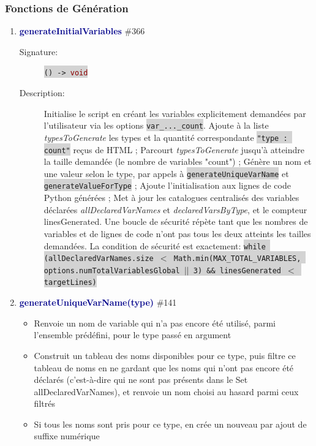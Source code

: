 \documentclass[11pt,a4paper]{article}
\newcommand{\code}[1]{\colorbox{lightgray}{\texttt{\small #1}}}
\newcommand{\var}[1]{\textit{#1}}
\newcommand{\methodname}[1]{\textbf{\textcolor{darkblue}{#1}}}
\newcommand{\param}[1]{\code{#1}}
\newcommand{\rettype}[1]{\textcolor{darkred}{#1}}
\begin{document}
\subsubsection*{Fonctions de Génération}

\begin{enumerate}
    \item \methodname{generateInitialVariables} \#366
    \begin{description}
        \item[Signature:] \code{() -> \rettype{void}}
        \item[Description:] Initialise le script en créant les variables explicitement demandées par l'utilisateur via les options \param{var\_...\_count}. Ajoute à la liste \var{typesToGenerate} les types et la quantité correspondante \code{"type : count"} reçus de HTML ; Parcourt \var{typesToGenerate} jusqu'à atteindre la taille demandée (le nombre de variables "count") ; Génère un nom et une valeur selon le type, par appels à \code{generateUniqueVarName} et \code{generateValueForType} ; Ajoute l'initialisation aux lignes de code Python générées ; Met à jour les catalogues centralisés des variables déclarées \var{allDeclaredVarNames} et \var{declaredVarsByType}, et le compteur linesGenerated. Une boucle de sécurité répète tant que les nombres de variables et de lignes de code n'ont pas tous les deux atteints les tailles demandées. La condition de sécurité est exactement: \code{while (allDeclaredVarNames.size $<$ Math.min(MAX\_TOTAL\_VARIABLES, options.numTotalVariablesGlobal $||$ 3) \&\& linesGenerated $<$ targetLines)}
    \end{description}

    \item \methodname{generateUniqueVarName(type)} \#141
    \begin{itemize}
        \item Renvoie un nom de variable qui n'a pas encore été utilisé, parmi l'ensemble prédéfini, pour le type passé en argument
        \item Construit un tableau des noms disponibles pour ce type, puis filtre ce tableau de noms en ne gardant que les noms qui n'ont pas encore été déclarés (c'est-à-dire qui ne sont pas présents dans le Set allDeclaredVarNames), et renvoie un nom choisi au hasard parmi ceux filtrés
        \item Si tous les noms sont pris pour ce type, en crée un nouveau par ajout de suffixe numérique
    \end{itemize} 


\end{enumerate}
\end{document}
